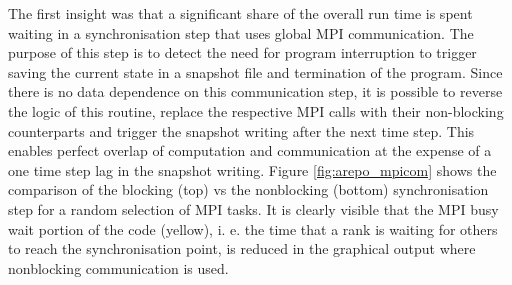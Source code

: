 \documentclass[../main]{subfiles}
\begin{document}
The first insight was that a significant share of the overall run time is spent waiting in a synchronisation step that uses global MPI communication.
The purpose of this step is to detect the need for program interruption to trigger saving the current state in a snapshot file and termination of the program.
Since there is no data dependence on this communication step, it is possible to reverse the logic of this routine, replace the respective MPI calls with their non-blocking counterparts and trigger the snapshot writing after the next time step.
This enables perfect overlap of computation and communication at the expense of a one time step lag in the snapshot writing.
Figure \ref{fig:arepo_mpicom} shows the comparison of the blocking (top) vs the nonblocking (bottom) synchronisation step for a random selection of MPI tasks. It is clearly visible that the MPI busy wait portion of the code (yellow), i. e.  the time that a rank is waiting for others to reach the synchronisation point, is reduced in the graphical output where nonblocking communication is used. 
\end{document}
